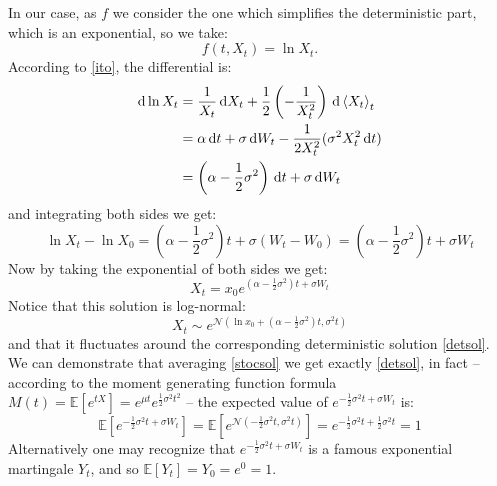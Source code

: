 In our case, as $f$ we consider the one which simplifies the deterministic part, which is an exponential, so we take:
\begin{equation}
    f(t,X_t) = \ln X_t.
\end{equation}
According to \eqref{ito}, the differential is:
\begin{align}
    \notag \dd\ln{X_t} &= \dfrac{1}{X_t}\,\dd X_t + \dfrac{1}{2}\left(-\dfrac{1}{X_t^2}\right)\,\dd \expval{X_t}_t \\
    &=
    \notag \alpha\,\dd t + \sigma\,\dd W_t - \dfrac{1}{2X_t^2}(\sigma^2X_t^2\,\dd t)\\
    &=
    \left(\alpha-\dfrac{1}{2}\sigma^2\right)\,\dd t + \sigma\,\dd W_t
\end{align}
and integrating both sides we get:
\begin{equation}
    \ln X_t - \ln X_0 = \left(\alpha-\dfrac{1}{2}\sigma^2\right)t + \sigma(W_t-W_0) = \left(\alpha-\dfrac{1}{2}\sigma^2\right)t + \sigma W_t
\end{equation}
Now by taking the exponential of both sides we get:
\begin{equation}\label{stocsol}
    X_t = x_0e^{\left(\alpha-\frac{1}{2}\sigma^2\right)t + \sigma W_t}
\end{equation}
Notice that this solution is log-normal:
\begin{equation*}
    X_t \sim e^{\mathcal{N}\left(\ln x_0 + \left(\alpha-\frac{1}{2}\sigma^2\right)t, \sigma^2 t\right)}
\end{equation*}
and that it fluctuates around the corresponding deterministic solution \eqref{detsol}. We can demonstrate that averaging \eqref{stocsol} we get exactly \eqref{detsol}, in fact -- according to the moment generating function formula ${M(t)=\mathbb{E}[e^{tX}]=e^{\mu t}e^{{\frac {1}{2}}\sigma^{2}t^{2}}}$ -- the expected value of $e^{-\frac{1}{2}\sigma^2 t + \sigma W_t}$ is:
\begin{equation*}
    \mathbb{E}\left[e^{-\frac{1}{2}\sigma^2 t + \sigma W_t}\right] = \mathbb{E}\left[
    e^{\mathcal{N}\left(-\frac{1}{2}\sigma^2 t, \sigma^2 t\right)}\right] = e^{-\frac{1}{2}\sigma^2 t + \frac{1}{2}\sigma^2 t} = 1
\end{equation*}
Alternatively one may recognize that $e^{-\frac{1}{2}\sigma^2 t + \sigma W_t}$ is a famous exponential martingale $Y_t$, and so $\mathbb{E}[Y_t]=Y_0=e^0 = 1$.

